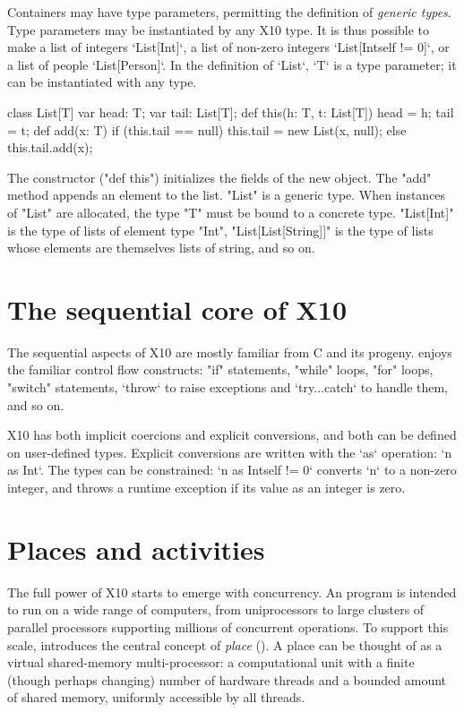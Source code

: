 Containers may have type parameters, permitting the definition of
{\em generic types}.  Type parameters may be instantiated by any X10 type.  It
is thus possible to make a list of integers \xcd`List[Int]`, a list of
non-zero integers \xcd`List[Int{self != 0}]`, or a list of people
\xcd`List[Person]`.  In the definition of \xcd`List`, \xcd`T` is a type
parameter; it can be instantiated with any type.
\begin{xten}
class List[T] {
    var head: T;
    var tail: List[T];
    def this(h: T, t: List[T]) { head = h; tail = t; }
    def add(x: T) {
        if (this.tail == null)
            this.tail = new List(x, null);
        else
            this.tail.add(x);
    }
}
\end{xten}
The constructor (\xcd"def this") initializes the fields of the new object.
The \xcd"add" method appends an element to the list.
\xcd"List" is a generic type.  When  instances of \xcd"List" are
allocated, the type \param{} \xcd"T" must be bound to a concrete
type.  \xcd"List[Int]" is the type of lists of element type
\xcd"Int", \xcd"List[List[String]]" is the type of lists whose elements are
themselves lists of string, and so on.


\section{The sequential core of X10}

The sequential aspects of X10 are mostly familiar from C and its progeny.
\Xten{} enjoys the familiar control flow constructs: \xcd"if" statements,
\xcd"while" loops, \xcd"for" loops, \xcd"switch" statements, \xcd`throw` to
raise exceptions and \xcd`try...catch` to handle them, and so on.

X10 has both implicit coercions and explicit conversions, and both can be
defined on user-defined types.  Explicit conversions are written with the
\xcd`as` operation: \xcd`n as Int`.  The types can be constrained: 
\xcd`n as Int{self != 0}` converts \xcd`n` to a non-zero integer, and throws a
runtime exception if its value as an integer is zero.

\section{Places and activities}

The full power of X10 starts to emerge with concurrency.
An \Xten{} program is intended to run on a wide range of computers,
from uniprocessors to large clusters of parallel processors supporting
millions of concurrent operations. To support this scale, \Xten{}
introduces the central concept of \emph{place} ().
A place can be thought of as a virtual shared-memory multi-processor:
a computational unit with a finite (though perhaps changing) number of
hardware threads and a bounded amount of shared memory, uniformly
accessible by all threads.


